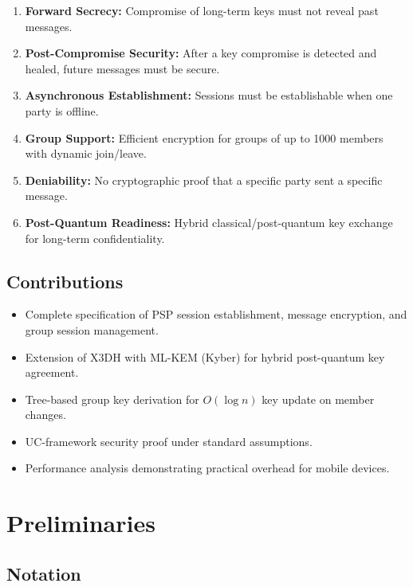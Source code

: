 \documentclass[11pt,a4paper]{article}
\begin{document}
\begin{enumerate}[label=\textbf{R\arabic*:}]
    \item \textbf{Forward Secrecy:} Compromise of long-term keys must not
    reveal past messages.
    \item \textbf{Post-Compromise Security:} After a key compromise is
    detected and healed, future messages must be secure.
    \item \textbf{Asynchronous Establishment:} Sessions must be
    establishable when one party is offline.
    \item \textbf{Group Support:} Efficient encryption for groups of up to
    1000 members with dynamic join/leave.
    \item \textbf{Deniability:} No cryptographic proof that a specific
    party sent a specific message.
    \item \textbf{Post-Quantum Readiness:} Hybrid classical/post-quantum
    key exchange for long-term confidentiality.
\end{enumerate}

\subsection{Contributions}

\begin{itemize}
    \item Complete specification of PSP session establishment, message
    encryption, and group session management.
    \item Extension of X3DH with ML-KEM (Kyber) for hybrid post-quantum
    key agreement.
    \item Tree-based group key derivation for $O(\log n)$ key update on
    member changes.
    \item UC-framework security proof under standard assumptions.
    \item Performance analysis demonstrating practical overhead for mobile
    devices.
\end{itemize}

\section{Preliminaries}
\label{sec:prelim}

\subsection{Notation}
\end{document}
